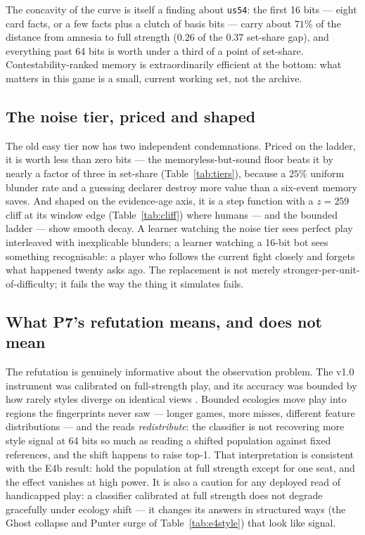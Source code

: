 \documentclass[11pt]{article}
\newcommand{\code}[1]{\texttt{#1}}
\newcommand{\usff}{\code{us54}}
\begin{document}
The concavity of the curve is itself a finding about \usff{}: the first 16 bits ---
eight card facts, or a few facts plus a clutch of basis bits --- carry about $71\%$ of
the distance from amnesia to full strength ($0.26$ of the $0.37$ set-share gap), and
everything past 64 bits is worth under a third of a point of set-share.
Contestability-ranked memory is extraordinarily
efficient at the bottom: what matters in this game is a small, current working set, not
the archive.

\subsection{The noise tier, priced and shaped}
\label{sec:noisetier}

The old easy tier now has two independent condemnations. Priced on the ladder, it is
worth less than zero bits --- the memoryless-but-sound floor beats it by nearly a
factor of three in set-share (Table~\ref{tab:tiers}), because a $25\%$ uniform blunder rate and
a guessing declarer destroy more value than a six-event memory saves. And shaped on
the evidence-age axis, it is a step function with a $z = 259$ cliff at its window edge
(Table~\ref{tab:cliff}) where humans --- and the bounded ladder --- show smooth decay.
A learner watching the noise tier sees perfect play interleaved with inexplicable
blunders; a learner watching a 16-bit bot sees something recognisable: a player who
follows the current fight closely and forgets what happened twenty asks ago. The
replacement is not merely stronger-per-unit-of-difficulty; it fails the way the thing
it simulates fails.

\subsection{What P7's refutation means, and does not mean}
\label{sec:p7meaning}

The refutation is genuinely informative about the observation problem. The v1.0
instrument \cite{obspaper} was calibrated on full-strength play, and its accuracy was
bounded by how rarely styles diverge on identical views \cite{inertpaper,styles}.
Bounded ecologies move play into regions the fingerprints never saw --- longer games,
more misses, different feature distributions --- and the reads \emph{redistribute}: the
classifier is not recovering more style signal at 64 bits so much as reading a shifted
population against fixed references, and the shift happens to raise top-1. That
interpretation is consistent with the E4b result: hold the population at full strength
except for one seat, and the effect vanishes at high power. It is also a caution for
any deployed read of handicapped play: a classifier calibrated at full strength does
not degrade gracefully under ecology shift --- it changes its answers in structured
ways (the Ghost collapse and Punter surge of Table~\ref{tab:e4style}) that look like
signal.
\end{document}
